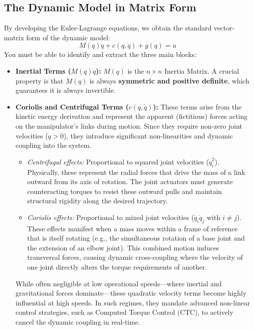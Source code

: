 \documentclass[11pt,a4paper]{article}
\begin{document}
\subsection{The Dynamic Model in Matrix Form}
By developing the Euler-Lagrange equations, we obtain the standard vector-matrix form of the dynamic model:
\begin{equation}
    M(q)\ddot{q} + c(q, \dot{q}) + g(q) = u
\end{equation}
You must be able to identify and extract the three main blocks:
\begin{itemize}
    \item \textbf{Inertial Terms ($M(q)\ddot{q}$):} $M(q)$ is the $n \times n$ Inertia Matrix. A crucial property is that $M(q)$ is always \textbf{symmetric and positive definite}, which guarantees it is always invertible.
    
\item \textbf{Coriolis and Centrifugal Terms ($c(q, \dot{q})$):} These terms arise from the kinetic energy derivation and represent the apparent (fictitious) forces acting on the manipulator's links during motion. Since they require non-zero joint velocities ($\dot{q} > 0$), they introduce significant non-linearities and dynamic coupling into the system.
    \begin{itemize}
        \item \textit{Centrifugal effects:} Proportional to squared joint velocities ($\dot{q}_i^2$). Physically, these represent the radial forces that drive the mass of a link outward from its axis of rotation. The joint actuators must generate counteracting torques to resist these outward pulls and maintain structural rigidity along the desired trajectory.
        \item \textit{Coriolis effects:} Proportional to mixed joint velocities ($\dot{q}_i \dot{q}_j$ with $i \neq j$). These effects manifest when a mass moves within a frame of reference that is itself rotating (e.g., the simultaneous rotation of a base joint and the extension of an elbow joint). This combined motion induces transversal forces, causing dynamic cross-coupling where the velocity of one joint directly alters the torque requirements of another.
    \end{itemize}
    While often negligible at low operational speeds—where inertial and gravitational forces dominate—these quadratic velocity terms become highly influential at high speeds. In such regimes, they mandate advanced non-linear control strategies, such as Computed Torque Control (CTC), to actively cancel the dynamic coupling in real-time.
    

\end{itemize}
\end{document}
